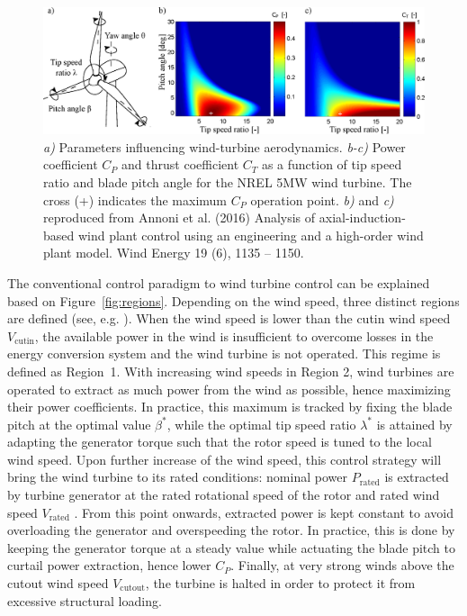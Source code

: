 \begin{figure}[t]
	\centering
	\includegraphics[width=\textwidth]{chapters/introduction/wt_drawing3.eps}
	\caption{\emph{a)} Parameters influencing wind-turbine aerodynamics. \emph{b-c)} Power coefficient $C_P$ and thrust coefficient $C_T$ as a function of tip speed ratio and blade pitch angle for the NREL 5MW wind turbine. The cross (+) indicates the maximum $C_P$ operation point. \emph{b)} and \emph{c)} reproduced from Annoni et al. (2016) Analysis of axial-induction-based wind plant control using an engineering and a high-order wind plant model. Wind Energy 19 (6), 1135 -- 1150. \label{fig:WT_drawing}}
\end{figure}

The conventional control paradigm to wind turbine control can be explained based on Figure~\ref{fig:regions}. Depending on the wind speed, three distinct regions are defined (see, e.g. \citealp{johnson2006control,laks2009control,pao2009tutorial}). When the wind speed is lower than the cutin wind speed $V_{\text{cutin}}$, the available power in the wind is insufficient to overcome losses in the energy conversion system and the wind turbine is not operated. This regime is defined as Region~1. With increasing wind speeds in Region 2, wind turbines are operated to extract as much power from the wind as possible, hence maximizing their power coefficients. In practice, this maximum is tracked by fixing the blade pitch at the optimal value $\beta^*$, while the optimal tip speed ratio $\lambda^*$ is attained by adapting the generator torque such that the rotor speed is tuned to the local wind speed. Upon further increase of the wind speed, this control strategy will bring the wind turbine to its rated conditions: nominal power $P_{\text{rated}}$ is extracted by turbine generator at the rated rotational speed of the rotor and rated wind speed $V_{\text{rated}}$ . From this point onwards, extracted power is kept constant to avoid overloading the generator and overspeeding the rotor. In practice, this is done by keeping the generator torque at a steady value while actuating the blade pitch to curtail power extraction, hence lower $C_P$. Finally, at very strong winds above the cutout wind speed $V_\text{cutout}$, the turbine is halted in order to protect it from excessive structural loading. 

